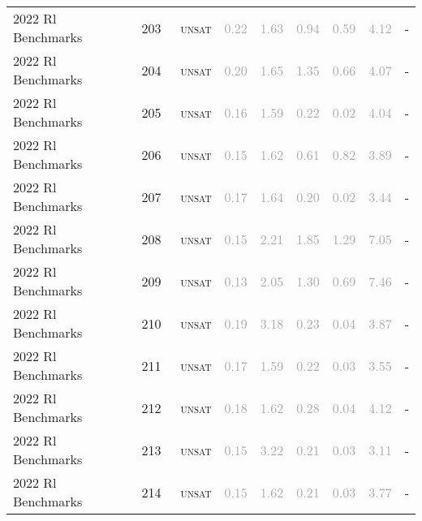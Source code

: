\begin{center}
{\begin{longtable}{@{}lllllllll@{}}
2022 Rl Benchmarks & 203 & ~\textsc{unsat} & \textcolor{darkgray}{0.22} & \textcolor{darkgray}{1.63} & \textcolor{darkgray}{0.94} & \textcolor{darkgray}{0.59} & \textcolor{darkgray}{4.12} & - \\
2022 Rl Benchmarks & 204 & ~\textsc{unsat} & \textcolor{darkgray}{0.20} & \textcolor{darkgray}{1.65} & \textcolor{darkgray}{1.35} & \textcolor{darkgray}{0.66} & \textcolor{darkgray}{4.07} & - \\
2022 Rl Benchmarks & 205 & ~\textsc{unsat} & \textcolor{darkgray}{0.16} & \textcolor{darkgray}{1.59} & \textcolor{darkgray}{0.22} & \textcolor{darkgray}{0.02} & \textcolor{darkgray}{4.04} & - \\
2022 Rl Benchmarks & 206 & ~\textsc{unsat} & \textcolor{darkgray}{0.15} & \textcolor{darkgray}{1.62} & \textcolor{darkgray}{0.61} & \textcolor{darkgray}{0.82} & \textcolor{darkgray}{3.89} & - \\
2022 Rl Benchmarks & 207 & ~\textsc{unsat} & \textcolor{darkgray}{0.17} & \textcolor{darkgray}{1.64} & \textcolor{darkgray}{0.20} & \textcolor{darkgray}{0.02} & \textcolor{darkgray}{3.44} & - \\
2022 Rl Benchmarks & 208 & ~\textsc{unsat} & \textcolor{darkgray}{0.15} & \textcolor{darkgray}{2.21} & \textcolor{darkgray}{1.85} & \textcolor{darkgray}{1.29} & \textcolor{darkgray}{7.05} & - \\
2022 Rl Benchmarks & 209 & ~\textsc{unsat} & \textcolor{darkgray}{0.13} & \textcolor{darkgray}{2.05} & \textcolor{darkgray}{1.30} & \textcolor{darkgray}{0.69} & \textcolor{darkgray}{7.46} & - \\
2022 Rl Benchmarks & 210 & ~\textsc{unsat} & \textcolor{darkgray}{0.19} & \textcolor{darkgray}{3.18} & \textcolor{darkgray}{0.23} & \textcolor{darkgray}{0.04} & \textcolor{darkgray}{3.87} & - \\
2022 Rl Benchmarks & 211 & ~\textsc{unsat} & \textcolor{darkgray}{0.17} & \textcolor{darkgray}{1.59} & \textcolor{darkgray}{0.22} & \textcolor{darkgray}{0.03} & \textcolor{darkgray}{3.55} & - \\
2022 Rl Benchmarks & 212 & ~\textsc{unsat} & \textcolor{darkgray}{0.18} & \textcolor{darkgray}{1.62} & \textcolor{darkgray}{0.28} & \textcolor{darkgray}{0.04} & \textcolor{darkgray}{4.12} & - \\
2022 Rl Benchmarks & 213 & ~\textsc{unsat} & \textcolor{darkgray}{0.15} & \textcolor{darkgray}{3.22} & \textcolor{darkgray}{0.21} & \textcolor{darkgray}{0.03} & \textcolor{darkgray}{3.11} & - \\
2022 Rl Benchmarks & 214 & ~\textsc{unsat} & \textcolor{darkgray}{0.15} & \textcolor{darkgray}{1.62} & \textcolor{darkgray}{0.21} & \textcolor{darkgray}{0.03} & \textcolor{darkgray}{3.77} & - \\

\end{longtable}}
\end{center}
